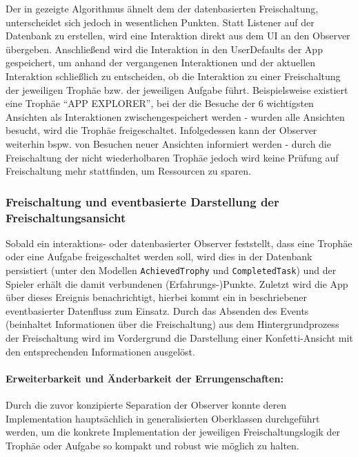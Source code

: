 \noindent Der in  gezeigte Algorithmus ähnelt dem der datenbasierten Freischaltung, unterscheidet sich jedoch in wesentlichen Punkten. Statt Listener auf der Datenbank zu erstellen, wird eine Interaktion direkt aus dem UI an den Observer übergeben. Anschließend wird die Interaktion in den UserDefaults der App gespeichert, um anhand der vergangenen Interaktionen und der aktuellen Interaktion schließlich zu entscheiden, ob die Interaktion zu einer Freischaltung der jeweiligen Trophäe bzw. der jeweiligen Aufgabe führt. Beispielsweise existiert eine Trophäe \enquote{APP EXPLORER}, bei der die Besuche der 6 wichtigsten Ansichten als Interaktionen zwischengespeichert werden - wurden alle Ansichten besucht, wird die Trophäe freigeschaltet. Infolgedessen kann der Observer weiterhin bspw. von Besuchen neuer Ansichten informiert werden - durch die Freischaltung der nicht wiederholbaren Trophäe jedoch wird keine Prüfung auf Freischaltung mehr stattfinden, um Ressourcen zu sparen.

\subsubsection{Freischaltung und eventbasierte Darstellung der Freischaltungsansicht}

Sobald ein interaktions- oder datenbasierter Observer feststellt, dass eine Trophäe oder eine Aufgabe freigeschaltet werden soll, wird dies in der Datenbank persistiert (unter den Modellen \texttt{AchievedTrophy} und \texttt{CompletedTask}) und der Spieler erhält die damit verbundenen (Erfahrungs-)Punkte. Zuletzt wird die App über dieses Ereignis benachrichtigt, hierbei kommt ein in  beschriebener eventbasierter Datenfluss zum Einsatz. Durch das Absenden des Events (beinhaltet Informationen über die Freischaltung) aus dem Hintergrundprozess der Freischaltung wird im Vordergrund die Darstellung einer Konfetti-Ansicht mit den entsprechenden Informationen ausgelöst.

\paragraph{Erweiterbarkeit und Änderbarkeit der Errungenschaften:} Durch die zuvor konzipierte Separation der Observer konnte deren Implementation hauptsächlich in generalisierten Oberklassen durchgeführt werden, um die konkrete Implementation der jeweiligen Freischaltungslogik der Trophäe oder Aufgabe so kompakt und robust wie möglich zu halten.

